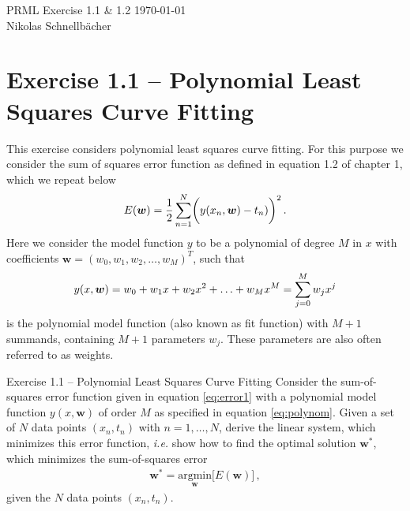 \documentclass[11pt,DINA4, fleqn]{amsart}
\def\vw{\boldsymbol{w}\xspace}
\begin{document}

\tikzset{node distance=2cm, auto}





\begin{flushleft}
{\sc \Large PRML Exercise 1.1 \& 1.2} \hfill \today \\
\medskip
Nikolas Schnellbächer \underline{\hspace{6.53in}} \\
\end{flushleft}

\section*{Exercise 1.1 -- Polynomial Least Squares Curve Fitting}
This exercise considers polynomial least squares curve fitting. 
For this purpose we consider the sum of squares error function as defined in equation 1.2 of chapter 1, which we repeat below
\begin{align}
E(\vw) = \dfrac{1}{2} \sum \displaylimits_{n = 1}^{N}
\biggl(y(x_n, \vw) - t_n)\biggl)^2 \, .
\label{eq:error1}
\end{align}
Here we consider the model function $y$ to be a polynomial of degree $M$ in $x$ with coefficients $\vw = (w_0, w_1, w_2, \dots , w_M)^{T}$, such that
\begin{align}
y(x,\vw) = w_0 + w_1 x + w_2 x^2 + \dotsc + w_M x^M = \sum \displaylimits_{j = 0}^{M} w_j x^j
\label{eq:polynom}
\end{align}
is the polynomial model function (also known as fit function) with $M + 1$ summands, containing $M+1$ parameters $w_j$. These parameters are also often referred to as weights.

\begin{mybox_tc3}{Exercise 1.1 -- Polynomial Least Squares Curve Fitting}
Consider the sum-of-squares error function given in equation \eqref{eq:error1}
with a polynomial model function $y(x,\vw)$ of order $M$ as specified in equation \eqref{eq:polynom}.
Given a set of $N$ data points $(x_n, t_n)$ with $n = 1, \dotsc, N$,
 derive the linear system, which minimizes this
error function, \textit{i.e.} show how to find the optimal solution $\vw^*$,
which minimizes the sum-of-squares error
\begin{align}
\vw^{*} =  \underset{\vw}{\text{argmin}}\biggl[ E(\vw)\biggl] \, ,
\end{align}
given the $N$ data points $(x_n, t_n)$.
\end{mybox_tc3}
\end{document}
